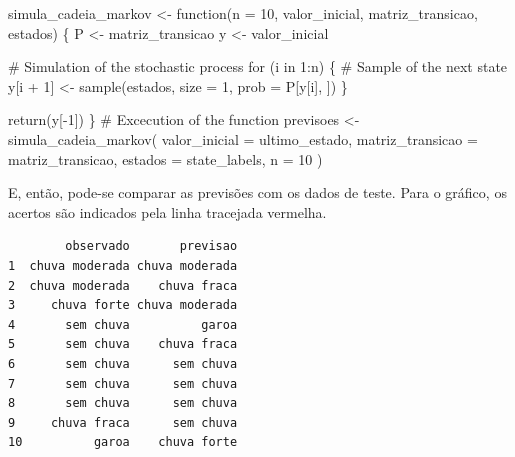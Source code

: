 \documentclass[
  letterpaper,
  DIV=11,
  numbers=noendperiod]{scrreprt}
\newenvironment{Shaded}{\begin{snugshade}}{\end{snugshade}}
\newcommand{\AttributeTok}[1]{\textcolor[rgb]{0.40,0.45,0.13}{#1}}
\newcommand{\CommentTok}[1]{\textcolor[rgb]{0.37,0.37,0.37}{#1}}
\newcommand{\ControlFlowTok}[1]{\textcolor[rgb]{0.00,0.23,0.31}{#1}}
\newcommand{\DecValTok}[1]{\textcolor[rgb]{0.68,0.00,0.00}{#1}}
\newcommand{\FunctionTok}[1]{\textcolor[rgb]{0.28,0.35,0.67}{#1}}
\newcommand{\NormalTok}[1]{\textcolor[rgb]{0.00,0.23,0.31}{#1}}
\newcommand{\OtherTok}[1]{\textcolor[rgb]{0.00,0.23,0.31}{#1}}
\newcommand{\SpecialCharTok}[1]{\textcolor[rgb]{0.37,0.37,0.37}{#1}}
\begin{document}
\begin{Shaded}
\begin{Highlighting}[]
\NormalTok{simula\_cadeia\_markov }\OtherTok{\textless{}{-}} \ControlFlowTok{function}\NormalTok{(}\AttributeTok{n =} \DecValTok{10}\NormalTok{,}
\NormalTok{                                 valor\_inicial,}
\NormalTok{                                 matriz\_transicao,}
\NormalTok{                                 estados) \{}
\NormalTok{    P }\OtherTok{\textless{}{-}}\NormalTok{ matriz\_transicao}
\NormalTok{    y }\OtherTok{\textless{}{-}}\NormalTok{ valor\_inicial}

    \CommentTok{\# Simulation of the stochastic process}
    \ControlFlowTok{for}\NormalTok{ (i }\ControlFlowTok{in} \DecValTok{1}\SpecialCharTok{:}\NormalTok{n) \{}
        \CommentTok{\# Sample of the next state}
\NormalTok{        y[i }\SpecialCharTok{+} \DecValTok{1}\NormalTok{] }\OtherTok{\textless{}{-}} \FunctionTok{sample}\NormalTok{(estados, }\AttributeTok{size =} \DecValTok{1}\NormalTok{, }\AttributeTok{prob =}\NormalTok{ P[y[i], ])}
\NormalTok{    \}}

    \FunctionTok{return}\NormalTok{(y[}\SpecialCharTok{{-}}\DecValTok{1}\NormalTok{])}
\NormalTok{\}}
\CommentTok{\# Excecution of the function}
\NormalTok{previsoes }\OtherTok{\textless{}{-}} \FunctionTok{simula\_cadeia\_markov}\NormalTok{(}
    \AttributeTok{valor\_inicial =}\NormalTok{ ultimo\_estado,}
    \AttributeTok{matriz\_transicao =}\NormalTok{ matriz\_transicao,}
    \AttributeTok{estados =}\NormalTok{ state\_labels,}
    \AttributeTok{n =} \DecValTok{10}
\NormalTok{)}
\end{Highlighting}
\end{Shaded}

E, então, pode-se comparar as previsões com os dados de teste. Para o
gráfico, os acertos são indicados pela linha tracejada vermelha.

\begin{Shaded}
\end{Shaded}

\begin{verbatim}
        observado       previsao
1  chuva moderada chuva moderada
2  chuva moderada    chuva fraca
3     chuva forte chuva moderada
4       sem chuva          garoa
5       sem chuva    chuva fraca
6       sem chuva      sem chuva
7       sem chuva      sem chuva
8       sem chuva      sem chuva
9     chuva fraca      sem chuva
10          garoa    chuva forte
\end{verbatim}
\end{document}
